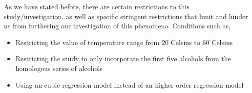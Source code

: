 {As we have stated before, there are certain restrictions to this study/investigation, as well as specific stringent restrictions that limit and hinder us from furthering our investigation of this phenomena. Conditions such as,}
        
    \begin{itemize}
        \item {Restricting the value of temperature range from $20^\circ$Celsius to $60^\circ$Celsius}
        \item {Restricting the study to only incorporate the first five alcohols from the homologous series of alcohols}
        \item {Using an cubic regression model instead of an higher order regression model}
    \end{itemize}
        
        

